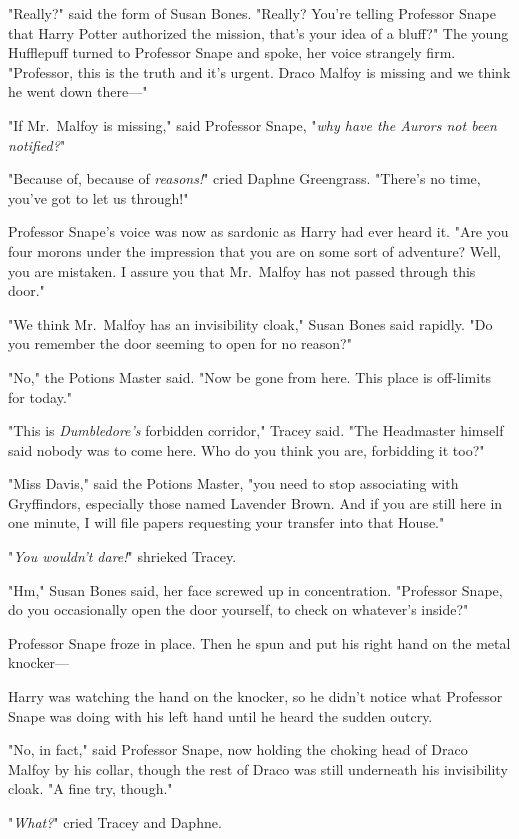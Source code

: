 "Really?" said the form of Susan Bones. "Really? You're telling Professor Snape 
that Harry Potter authorized the mission, that's your idea of a bluff?" The 
young Hufflepuff turned to Professor Snape and spoke, her voice strangely firm. 
"Professor, this is the truth and it's urgent. Draco Malfoy is missing and we 
think he went down there---"

"If Mr.~Malfoy is missing," said Professor Snape, "\emph{why have the Aurors 
not been notified?}"

"Because of, because of \emph{reasons!}" cried Daphne Greengrass. "There's no 
time, you've got to let us through!"

Professor Snape's voice was now as sardonic as Harry had ever heard it. "Are 
you four morons under the impression that you are on some sort of adventure? 
Well, you are mistaken. I assure you that Mr.~Malfoy has not passed through 
this door."

"We think Mr.~Malfoy has an invisibility cloak," Susan Bones said rapidly. "Do 
you remember the door seeming to open for no reason?"

"No," the Potions Master said. "Now be gone from here. This place is off-limits 
for today."

"This is \emph{Dumbledore's} forbidden corridor," Tracey said. "The Headmaster 
himself said nobody was to come here. Who do you think you are, forbidding it 
too?"

"Miss Davis," said the Potions Master, "you need to stop associating with 
Gryffindors, especially those named Lavender Brown. And if you are still here 
in one minute, I will file papers requesting your transfer into that House."

"\emph{You wouldn't dare!}" shrieked Tracey.

"Hm," Susan Bones said, her face screwed up in concentration. "Professor Snape, 
do you occasionally open the door yourself, to check on whatever's inside?"

Professor Snape froze in place. Then he spun and put his right hand on the 
metal knocker---

Harry was watching the hand on the knocker, so he didn't notice what Professor 
Snape was doing with his left hand until he heard the sudden outcry.

"No, in fact," said Professor Snape, now holding the choking head of Draco 
Malfoy by his collar, though the rest of Draco was still underneath his 
invisibility cloak. "A fine try, though."

"\emph{What?}" cried Tracey and Daphne.

